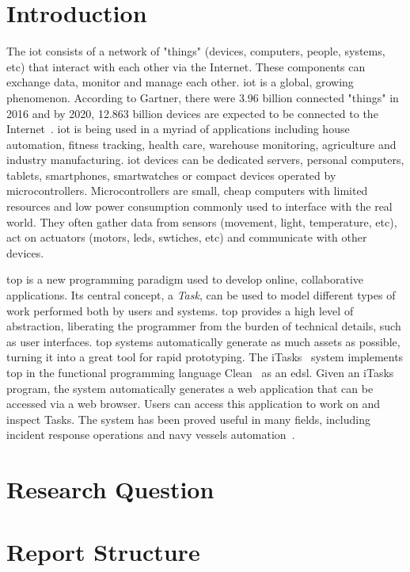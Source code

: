 \section{Introduction}
The \ac{iot} consists of a network of "things" (devices, computers, people, systems, etc) that interact with each other via the Internet. These components can exchange data, monitor and manage each other. \ac{iot} is a global, growing phenomenon. According to Gartner, there were 3.96 billion connected "things" in 2016 and by 2020, 12.863 billion devices are expected to be connected to the Internet~\cite{iot_numbers}. \ac{iot} is being used in a myriad of applications including house automation, fitness tracking, health care, warehouse monitoring, agriculture and industry manufacturing. \ac{iot} devices can be dedicated servers, personal computers, tablets, smartphones, smartwatches or compact devices operated by microcontrollers. Microcontrollers are small, cheap computers with limited resources and low power consumption commonly used to interface with the real world. They often gather data from sensors (movement, light, temperature, etc), act on actuators (motors, \acsp{led}, swtiches, etc) and communicate with other devices.

\ac{top} is a new programming paradigm used to develop online, collaborative applications. Its central concept, a \textit{Task}, can be used to model different types of work performed both by users and systems. \ac{top} provides a high level of abstraction, liberating the programmer from the burden of technical details, such as user interfaces. \ac{top} systems automatically generate as much assets as possible, turning it into a great tool for rapid prototyping. The iTasks~\cite{top} system implements \ac{top} in the functional programming language Clean~\cite{clean} as an \ac{edsl}. Given an iTasks program, the system automatically generates a web application that can be accessed via a web browser. Users can access this application to work on and inspect Tasks. The system has been proved useful in many fields, including incident response operations and navy vessels automation~\cite{incidone,navy}.


\section{Research Question}
\section{Report Structure}

